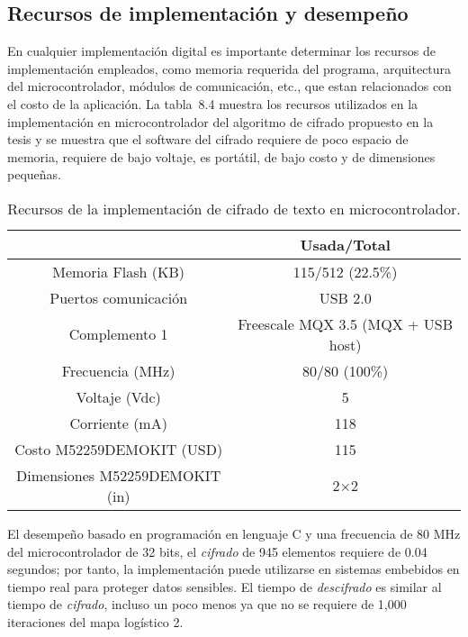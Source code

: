 \subsection{Recursos de implementación y desempeño}
En cualquier implementación digital es importante determinar los recursos de implementación empleados, como memoria requerida del programa, arquitectura del microcontrolador, módulos de comunicación, etc., que estan relacionados con el costo de la aplicación. La tabla~8.4 muestra los recursos utilizados en la implementación en microcontrolador del algoritmo de cifrado propuesto en la tesis y se muestra que el software del cifrado requiere de poco espacio de memoria, requiere de bajo voltaje, es portátil, de bajo costo y de dimensiones pequeñas. \\
\begin{table}[!htbp] %
	\center
	\begin{tabular}{c c} 
	\hline
							&	Usada/Total					\\
	\hline
	Memoria Flash (KB)		&	115/512	 (22.5\%) 			\\
	Puertos comunicación				&   USB 2.0 		\\	
	Complemento 1			&   Freescale MQX 3.5 (MQX + USB host)	\\	
	Frecuencia (MHz)		&	80/80  (100\%)		\\
	Voltaje (Vdc)			&   5		\\	
	Corriente (mA)			&   118		\\	
	Costo M52259DEMOKIT (USD)&   115		\\			
	Dimensiones M52259DEMOKIT (in)	&   2$\times$2		\\		
	\hline
\end{tabular}
	\caption{Recursos de la implementación de cifrado de texto en microcontrolador.}
\end{table}

El desempeño basado en programación en lenguaje C y una frecuencia de 80 MHz del microcontrolador de 32 bits, el \textit{cifrado} de 945 elementos requiere de 0.04 segundos; por tanto, la implementación puede utilizarse en sistemas embebidos en tiempo real para proteger datos sensibles. El tiempo de \textit{descifrado} es similar al tiempo de \textit{cifrado}, incluso un poco menos ya que no se requiere de 1,000 iteraciones del mapa logístico 2.

